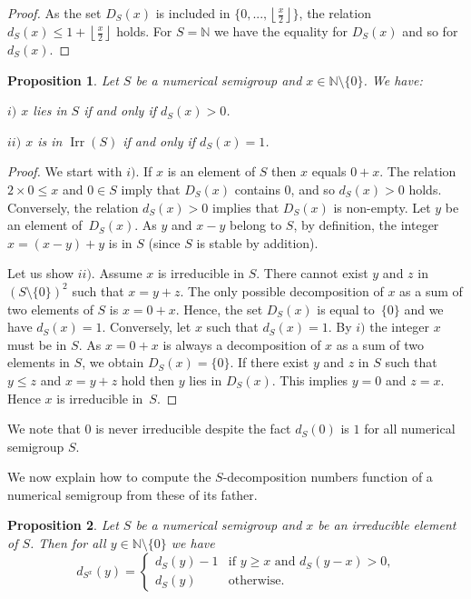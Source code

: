 \documentclass[reqno,11pt]{amsart}
\theoremstyle{plain}
\newtheorem{prop}{Proposition}[section]
\theoremstyle{definition}
\renewcommand{\leq}{\leqslant}
\renewcommand{\geq}{\geqslant}
\newcommand{\NN}{\mathbb{N}}
\DeclareMathOperator{\Irr}{Irr}
\begin{document}
\begin{proof}
As the set $D_S(x)$ is included in $\{0,...,\left\lfloor\frac x2\right\rfloor\}$, the relation $d_S(x)\leq 1+\left\lfloor \frac{x}2\right\rfloor$ holds.
For $S=\NN$ we have the equality for $D_S(x)$ and so for $d_S(x)$.
\end{proof}


\begin{prop}
\label{P:Dandd}
Let $S$ be a numerical semigroup and $x\in\NN\setminus\{0\}$.  We have:

 $i)$ $x$ lies in $S$ if and only if $d_S(x)>0$.

 $ii)$ $x$ is in $\Irr(S)$ if and only if $d_S(x)=1$.
\end{prop}

\begin{proof}
We start with $i)$. If $x$ is an element of $S$ then $x$ equals $0+x$. 
The relation~$2\times 0\leq x$ and $0\in S$ imply that $D_S(x)$ contains $0$, and so $d_S(x)>0$ holds.
Conversely, the relation  $d_S(x)>0$  implies that $D_S(x)$ is non-empty. 
Let $y$ be an element of~$D_S(x)$. 
As $y$ and $x-y$ belong to  $S$, by definition, the integer $x=(x-y)+y$ is in $S$  (since $S$ is stable by addition).

Let us show $ii)$. 
Assume $x$ is irreducible in $S$.
There cannot exist $y$ and $z$ in~$(S\setminus\{0\})^2$ such that $x=y+z$. 
The only possible decomposition of $x$ as a sum of two elements of $S$ is $x=0+x$. 
Hence, the set $D_S(x)$ is equal to~$\{0\}$ and we have $d_S(x)=1$. 
Conversely, let $x$ such that $d_S(x)=1$. 
By  $i)$ the  integer $x$ must be in $S$. 
As $x=0+x$ is always a decomposition of $x$ as a sum of two elements in $S$, we obtain $D_S(x)=\{0\}$.
If there exist $y$ and $z$ in $S$ such that $y\leq z$ and $x=y+z$ hold then $y$ lies in $D_S(x)$. 
This implies $y=0$ and $z=x$. 
Hence $x$ is irreducible in~$S$.
\end{proof}

We note  that $0$ is never irreducible despite the fact $d_S(0)$ is $1$ for all numerical semigroup $S$.

We now explain how to compute the $S$-decomposition numbers function of a numerical semigroup  from these of its father.

\begin{prop}
Let $S$ be a numerical semigroup and $x$ be an irreducible element of $S$. 
Then for all $y\in \NN\setminus\{0\}$ we have
\[
d_{S^x}(y)=\begin{cases}
d_S(y)-1&\text{if $y\geq x$ and $d_S(y-x)>0$,}\\
d_S(y) &\text{otherwise.}
\end{cases}
\] 
\end{prop}
\end{document}
